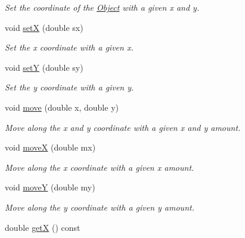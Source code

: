 \begin{DoxyCompactItemize}
\begin{DoxyCompactList}\small\item\em Set the coordinate of the \hyperlink{classObject}{Object} with a given x and y. \end{DoxyCompactList}\item 
void \hyperlink{classObject_a3a3e2b361faf2deb8663ecda9c6c4868}{setX} (double sx)\hypertarget{classObject_a3a3e2b361faf2deb8663ecda9c6c4868}{}\label{classObject_a3a3e2b361faf2deb8663ecda9c6c4868}

\begin{DoxyCompactList}\small\item\em Set the x coordinate with a given x. \end{DoxyCompactList}\item 
void \hyperlink{classObject_acab13582a9cb12392fc7a83d1d80e3d6}{setY} (double sy)\hypertarget{classObject_acab13582a9cb12392fc7a83d1d80e3d6}{}\label{classObject_acab13582a9cb12392fc7a83d1d80e3d6}

\begin{DoxyCompactList}\small\item\em Set the y coordinate with a given y. \end{DoxyCompactList}\item 
void \hyperlink{classObject_af4133db64f4051294dc103a2f3553a6a}{move} (double x, double y)\hypertarget{classObject_af4133db64f4051294dc103a2f3553a6a}{}\label{classObject_af4133db64f4051294dc103a2f3553a6a}

\begin{DoxyCompactList}\small\item\em Move along the x and y coordinate with a given x and y amount. \end{DoxyCompactList}\item 
void \hyperlink{classObject_a43f3220cb27a282c28afaea57ac9a098}{moveX} (double mx)\hypertarget{classObject_a43f3220cb27a282c28afaea57ac9a098}{}\label{classObject_a43f3220cb27a282c28afaea57ac9a098}

\begin{DoxyCompactList}\small\item\em Move along the x coordinate with a given x amount. \end{DoxyCompactList}\item 
void \hyperlink{classObject_a58bab6e78efd8282996d742530c98034}{moveY} (double my)\hypertarget{classObject_a58bab6e78efd8282996d742530c98034}{}\label{classObject_a58bab6e78efd8282996d742530c98034}

\begin{DoxyCompactList}\small\item\em Move along the y coordinate with a given y amount. \end{DoxyCompactList}\item 
double \hyperlink{classObject_a313c75c1fdb4a1521ed91b27fd648f44}{getX} () const \hypertarget{classObject_a313c75c1fdb4a1521ed91b27fd648f44}{}\label{classObject_a313c75c1fdb4a1521ed91b27fd648f44}


\end{DoxyCompactItemize}
